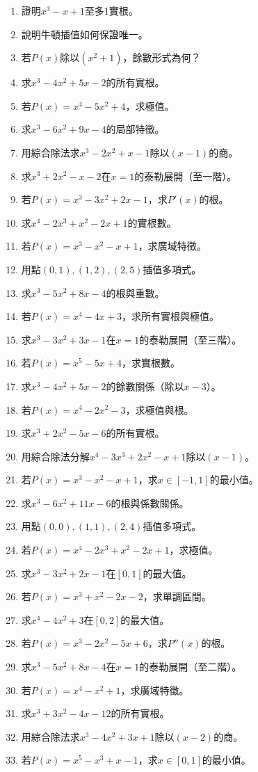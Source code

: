 \begin{enumerate}[label=\arabic*.]
    \item 證明$x^3 - x + 1$至多1實根。
    \item 說明牛頓插值如何保證唯一。
    \item 若$P(x)$除以$(x^2 + 1)$，餘數形式為何？
    \item 求$x^3 - 4x^2 + 5x - 2$的所有實根。
    \item 若$P(x) = x^4 - 5x^2 + 4$，求極值。
    \item 求$x^3 - 6x^2 + 9x - 4$的局部特徵。
    \item 用綜合除法求$x^3 - 2x^2 + x - 1$除以$(x - 1)$的商。
    \item 求$x^3 + 2x^2 - x - 2$在$x = 1$的泰勒展開（至一階）。
    \item 若$P(x) = x^3 - 3x^2 + 2x - 1$，求$P'(x)$的根。
    \item 求$x^4 - 2x^3 + x^2 - 2x + 1$的實根數。
    \item 若$P(x) = x^3 - x^2 - x + 1$，求廣域特徵。
    \item 用點$(0, 1), (1, 2), (2, 5)$插值多項式。
    \item 求$x^3 - 5x^2 + 8x - 4$的根與重數。
    \item 若$P(x) = x^4 - 4x + 3$，求所有實根與極值。
    \item 求$x^3 - 3x^2 + 3x - 1$在$x = 1$的泰勒展開（至三階）。
    \item 若$P(x) = x^5 - 5x + 4$，求實根數。
    \item 求$x^3 - 4x^2 + 5x - 2$的餘數關係（除以$x - 3$）。
    \item 若$P(x) = x^4 - 2x^2 - 3$，求極值與根。
    \item 求$x^3 + 2x^2 - 5x - 6$的所有實根。
    \item 用綜合除法分解$x^4 - 3x^3 + 2x^2 - x + 1$除以$(x - 1)$。
    \item 若$P(x) = x^3 - x^2 - x + 1$，求$x \in [-1, 1]$的最小值。
    \item 求$x^3 - 6x^2 + 11x - 6$的根與係數關係。
    \item 用點$(0, 0), (1, 1), (2, 4)$插值多項式。
    \item 若$P(x) = x^4 - 2x^3 + x^2 - 2x + 1$，求極值。
    \item 求$x^3 - 3x^2 + 2x - 1$在$[0, 1]$的最大值。
    \item 若$P(x) = x^3 + x^2 - 2x - 2$，求單調區間。
    \item 求$x^4 - 4x^2 + 3$在$[0, 2]$的最大值。
    \item 若$P(x) = x^3 - 2x^2 - 5x + 6$，求$P''(x)$的根。
    \item 求$x^3 - 5x^2 + 8x - 4$在$x = 1$的泰勒展開（至二階）。
    \item 若$P(x) = x^4 - x^2 + 1$，求廣域特徵。
    \item 求$x^3 + 3x^2 - 4x - 12$的所有實根。
    \item 用綜合除法求$x^3 - 4x^2 + 3x + 1$除以$(x - 2)$的商。
    \item 若$P(x) = x^5 - x^3 + x - 1$，求$x \in [0, 1]$的最小值。
\end{enumerate}
